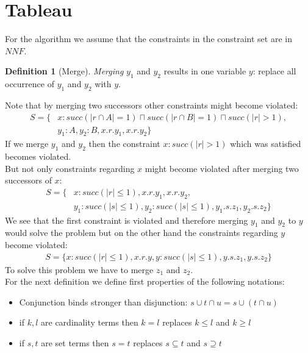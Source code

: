 \documentclass[a4paper,11pt]{scrartcl}
\theoremstyle{break}
\theoremstyle{definition}
\newtheorem{mydef}{Definition}
\begin{document}
\section{Tableau}
For the algorithm we assume that the constraints in the constraint set are in $NNF$.
\begin{mydef}[Merge]
\textit{Merging} $y_1$ and $y_2$ results in one variable $y$: replace all occurrence of $y_1$ and $y_2$ with $y$. 
\end{mydef}
Note that by merging two successors other constraints might become violated:
\begin{align}
S=\{&x:succ(|r\cap A|=1)\sqcap succ(|r\cap B|=1)\sqcap succ(|r|>1),\nonumber\\ &y_1:A, y_2:B, x.r.y_1, x.r.y_2\}
\end{align}
If we merge $y_1$ and $y_2$ then the constraint $x:succ(|r|>1)$ which was satisfied becomes violated.\\
But not only constraints regarding $x$ might become violated after merging two successors of $x$: 
\begin{align}
S=\{&x:succ(|r|\leq 1), x.r.y_1, x.r.y_2,\nonumber
\\&y_1:succ(|s|\leq 1), y_2:succ(|s|\leq 1), y_1.s.z_1, y_2.s.z_2\}
\end{align}
We see that the first constraint is violated and therefore merging $y_1$ and $y_2$ to $y$ would solve the problem but on the other hand the constraints regarding $y$ become violated: 
\begin{align*}
S=\{x:succ(|r|\leq 1), x.r.y,
y:succ(|s|\leq 1), y.s.z_1, y.s.z_2\}
\end{align*}
To solve this problem we have to merge $z_1$ and $z_2$.\\
For the next definition we define first properties of the following notations:
\begin{itemize}
\item Conjunction binds stronger than disjunction: $s\cup t\cap u = s\cup (t\cap u)$
\item if $k,l$ are cardinality terms then $k=l$ replaces $k\leq l$ and $k\geq l$ 
\item if $s,t$ are set terms then $s=t$ replaces $s\subseteq t$ and $s\supseteq t$
\end{itemize}
\end{document}

